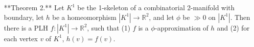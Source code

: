 **Theorem 2.** Let $K^1$ be the 1-skeleton of a combinatorial 2-manifold with boundary, let $h$ be a homeomorphism $|K^1| \rightarrow \mathbb{R}^2$, and let $\phi$ be $\gg 0$ on $|K^1|$. Then there is a PLH $f: |K^1| \rightarrow \mathbb{R}^2$, such that (1) $f$ is a $\phi$-approximation of $h$ and (2) for each vertex $v$ of $K^1$, $h(v) = f(v)$.
